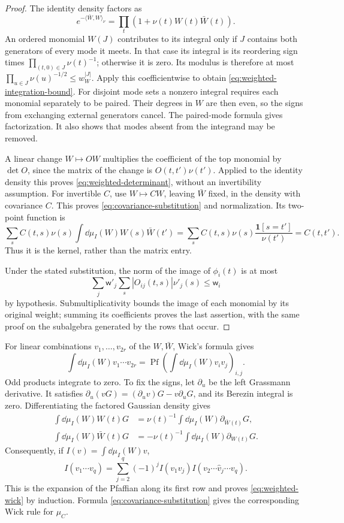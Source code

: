 \begin{proof}
The identity density factors as
\[
 e^{-\langle\bar W,W\rangle_\nu}
            =\prod_t(1+\nu(t)W(t)\bar W(t)).
\]
An ordered monomial $W(J)$ contributes to its integral only if $J$
contains both generators of every mode it meets. In that case its
integral is its reordering sign times
$\prod_{(t,0)\in J}\nu(t)^{-1}$; otherwise it is zero. Its modulus
is therefore at most $\prod_{u\in J}\nu(u)^{-1/2}\le w_W^{|J|}$.
Apply this coefficientwise to obtain
\eqref{eq:weighted-integration-bound}. For disjoint mode sets a
nonzero integral requires each monomial separately to be paired.
Their degrees in $W$ are then even, so the signs from exchanging
external generators cancel. The paired-mode formula gives
factorization. It also shows that modes absent from the integrand may
be removed.

A linear change $W\mapsto OW$ multiplies the coefficient of the top
monomial by $\det O$, since the matrix of the change is
$O(t,t')\nu(t')$. Applied to the identity density this proves
\eqref{eq:weighted-determinant}, without an invertibility assumption.
For invertible $C$, use $W\mapsto CW$, leaving $\bar W$ fixed, in
the density with covariance $C$. This proves
\eqref{eq:covariance-substitution} and normalization. Its two-point
function is
\[
 \sum_s C(t,s)\nu(s)\int\dd\mu_I(W)W(s)\bar W(t')
       =\sum_s C(t,s)\nu(s)\frac{\mathbf1[s=t']}{\nu(t')}
       =C(t,t').
\]
Thus it is the kernel, rather than the matrix entry.

Under the stated substitution, the norm of the image of
$\phi_i(t)$ is at most
\[
 \sum_j\mathsf w'_j\sum_s|O_{ij}(t,s)|\nu'_j(s)\le\mathsf w_i
\]
by hypothesis. Submultiplicativity bounds
the image of each monomial by its original weight; summing its
coefficients proves the last assertion, with the same proof on the
subalgebra generated by the rows that occur.
\end{proof}

For linear combinations $v_1,\ldots,v_{2r}$ of the $W,\bar W$,
Wick's formula gives
\begin{equation}\label{eq:weighted-wick}
 \int\dd\mu_I(W)v_1\cdots v_{2r}
      =\operatorname{Pf}\left(\int\dd\mu_I(W)v_iv_j\right)_{i,j}.
\end{equation}
Odd products integrate to zero. To fix the signs, let $\partial_u$
be the left Grassmann derivative. It satisfies
$\partial_u(vG)=(\partial_uv)G-v\partial_uG$, and its Berezin
integral is zero. Differentiating the factored Gaussian density gives
\begin{align*}
 \int\dd\mu_I(W)W(t)G
      &=\nu(t)^{-1}\int\dd\mu_I(W)\partial_{\bar W(t)}G,\\
 \int\dd\mu_I(W)\bar W(t)G
      &=-\nu(t)^{-1}\int\dd\mu_I(W)\partial_{W(t)}G.
\end{align*}
Consequently, if $I(v)=\int\dd\mu_I(W)v$,
\[
 I(v_1\cdots v_q)=\sum_{j=2}^q(-1)^jI(v_1v_j)
                         I(v_2\cdots\widehat v_j\cdots v_q).
\]
This is the expansion of the Pfaffian along its first row and proves
\eqref{eq:weighted-wick} by induction. Formula
\eqref{eq:covariance-substitution} gives the corresponding Wick rule
for $\mu_C$.

